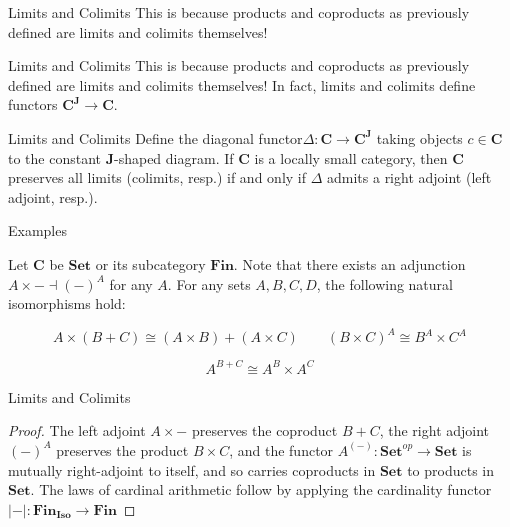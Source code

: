 \documentclass[tikz]{beamer}
\theoremstyle{definition}
\newcommand{\cat}[1]{\mathbf{#1}}
\begin{document}
\begin{frame}{Limits and Colimits}
This is because products and coproducts as previously defined are limits and colimits themselves!
\end{frame}

\begin{frame}{Limits and Colimits}
This is because products and coproducts as previously defined are limits and colimits themselves! In fact, limits and colimits define functors $\cat{C}^{\cat{J}} \to \cat{C}$.
\end{frame}


\begin{frame}{Limits and Colimits}
Define the diagonal functor$ \Delta : \cat{C} \to \cat{C}^{\cat{J}}$ taking objects $c \in \cat{C}$ to the constant $\cat{J}$-shaped diagram. If $\cat{C}$ is a locally small category, then $\cat{C}$ preserves all limits (colimits, resp.) if and only if $\Delta$ admits a right adjoint (left adjoint, resp.).
\end{frame}

\begin{frame}{Examples}

Let $\cat{C}$ be $\cat{Set}$ or its subcategory $\cat{Fin}$. Note that there exists an adjunction $A \times - \dashv (-)^A$ for any $A$. For any sets $A, B, C, D$, the following natural isomorphisms hold:

\begin{center}
\begin{equation*}
A \times (B + C) \cong (A \times B) + (A \times C) \qquad (B \times C)^A \cong B^A \times C^A
\end{equation*}

\begin{equation*}
A^{B + C} \cong A^B \times A^C
\end{equation*}
\end{center}


\end{frame}

\begin{frame}{Limits and Colimits}
\begin{proof}
The left adjoint $A \times -$ preserves the coproduct $B + C$, the right adjoint $(-)^A$ preserves the product $B \times C$, and the functor $A^{(-)}: \cat{Set}^{op} \to \cat{Set}$ is mutually right-adjoint to itself, and so carries coproducts in $\cat{Set}$ to products in $\cat{Set}$. The laws of cardinal arithmetic follow by applying the cardinality functor $|-|: \cat{Fin_{Iso}} \to \cat{Fin}$

\end{proof}
\end{frame}
\end{document}
